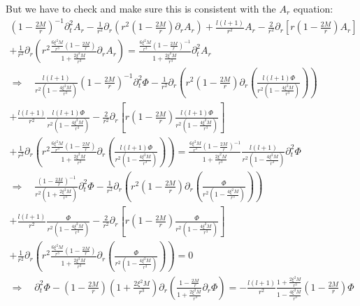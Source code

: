 \documentclass[12pt]{article}
\def\nn{\nonumber}
\begin{document}
But we have to check and make sure this is consistent with the $A_{r}$ equation:
\begin{gather}
(1 - \frac{2 M}{r})^{-1}
\partial_{t}^{2}
A_{r}
-
\frac{1}{r^{2}}
\partial_{r}
\left(
r^{2}
(1 - \frac{2 M}{r})
\partial_{r}
A_{r}
\right)
+
\frac{l (l + 1)}{r^{2}}
A_{r}
-
\frac{2}{r^{2}}
\partial_{r}
\left[
r
(1 - \frac{2 M}{r})
A_{r}
\right]
\nn \\
+
\frac{1}{r^{2}}
\partial_{r}
\left(
r^{2}
\frac{\frac{6 \xi^{2} M}{r^{3}} (1 - \frac{2 M}{r})}{1 + \frac{2 \xi^{2} M}{r^{3}}}
\partial_{r} A_{r}
\right)
=
\frac{\frac{6 \xi^{2} M}{r^{3}} (1 - \frac{2 M}{r})^{-1}}{1 + \frac{2 \xi^{2} M}{r^{3}}}
\partial_{t}^{2} A_{r} 
\nn \\
\Rightarrow
\quad
\frac{l (l + 1)}{r^{2} (1 - \frac{4 \xi^{2} M}{r^{3}})}
(1 - \frac{2 M}{r})^{-1}
\partial_{t}^{2}
\Phi
-
\frac{1}{r^{2}}
\partial_{r}
\left(
r^{2}
(1 - \frac{2 M}{r})
\partial_{r}
\left(
\frac{l (l + 1) \Phi}{r^{2} (1 - \frac{4 \xi^{2} M}{r^{3}})}
\right)
\right)
\nn \\
+
\frac{l (l + 1)}{r^{2}}
\frac{l (l + 1) \Phi}{r^{2} (1 - \frac{4 \xi^{2} M}{r^{3}})}
-
\frac{2}{r^{2}}
\partial_{r}
\left[
r
(1 - \frac{2 M}{r})
\frac{l (l + 1) \Phi}{r^{2} (1 - \frac{4 \xi^{2} M}{r^{3}})}
\right]
\nn \\
+
\frac{1}{r^{2}}
\partial_{r}
\left(
r^{2}
\frac{\frac{6 \xi^{2} M}{r^{3}} (1 - \frac{2 M}{r})}{1 + \frac{2 \xi^{2} M}{r^{3}}}
\partial_{r} 
\left(
\frac{l (l + 1) \Phi}{r^{2} (1 - \frac{4 \xi^{2} M}{r^{3}})}
\right)
\right)
=
\frac{\frac{6 \xi^{2} M}{r^{3}} (1 - \frac{2 M}{r})^{-1}}{1 + \frac{2 \xi^{2} M}{r^{3}}}
\frac{l (l + 1)}{r^{2} (1 - \frac{4 \xi^{2} M}{r^{3}})}
\partial_{t}^{2} \Phi
\nn \\
\Rightarrow
\quad
\frac{(1 - \frac{2 M}{r})^{-1}}{r^{2} (1 + \frac{2 \xi^{2} M}{r^{3}})}
\partial_{t}^{2}
\Phi
-
\frac{1}{r^{2}}
\partial_{r}
\left(
r^{2}
(1 - \frac{2 M}{r})
\partial_{r}
\left(
\frac{ \Phi}{r^{2} (1 - \frac{4 \xi^{2} M}{r^{3}})}
\right)
\right)
\nn \\
+
\frac{l (l + 1)}{r^{2}}
\frac{ \Phi}{r^{2} (1 - \frac{4 \xi^{2} M}{r^{3}})}
-
\frac{2}{r^{2}}
\partial_{r}
\left[
r
(1 - \frac{2 M}{r})
\frac{\Phi}{r^{2} (1 - \frac{4 \xi^{2} M}{r^{3}})}
\right]
\nn \\
+
\frac{1}{r^{2}}
\partial_{r}
\left(
r^{2}
\frac{\frac{6 \xi^{2} M}{r^{3}} (1 - \frac{2 M}{r})}{1 + \frac{2 \xi^{2} M}{r^{3}}}
\partial_{r} 
\left(
\frac{\Phi}{r^{2} (1 - \frac{4 \xi^{2} M}{r^{3}})}
\right)
\right)
=
0
\nn \\
\Rightarrow
\quad
\partial_{t}^{2}
\Phi
-
(1 - \frac{2 M}{r})
(1 + \frac{2 \xi^{2} M}{r^{3}})
\partial_{r}
\left(
\frac{1 - \frac{2 M}{r}}{1 + \frac{2 \xi^{2} M}{r^{3}}}
\partial_{r}
\Phi
\right)
=-
\frac{l (l + 1)}{r^{2}}
\frac{1 + \frac{2 \xi^{2} M}{r^{3}}}{1 - \frac{4 \xi^{2} M}{r^{3}}}
(1 - \frac{2 M}{r})
\Phi
\end{gather}
\end{document}
